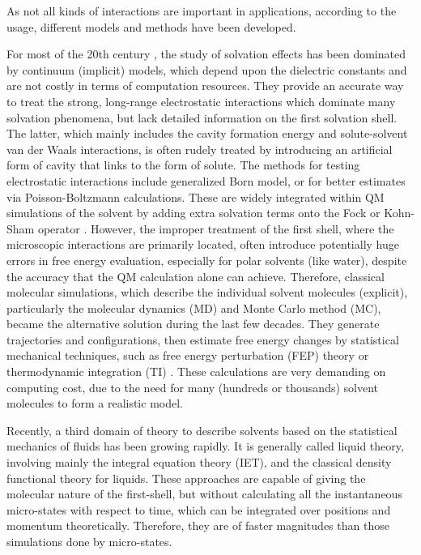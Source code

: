 As not all kinds of interactions are important in applications, according
to the usage, different models and methods have been developed.

For most of the 20th century \citep{Cramer_1999}, the study of
solvation effects has been dominated by continuum (implicit) models,
which depend upon the dielectric constants and are not costly
in terms of computation resources. They provide an accurate way to treat the
strong, long-range electrostatic interactions which dominate many
solvation phenomena, but lack detailed information on the first
solvation shell. The latter, which mainly includes the cavity formation
energy and solute-solvent van der Waals interactions, is often rudely
treated by introducing an artificial form of cavity that links to the
form of solute. The methods for testing electrostatic interactions include
generalized Born model, or for better estimates via Poisson-Boltzmann
calculations. These are widely integrated within \acs{QM} simulations
of the solvent by adding extra solvation terms onto the Fock or Kohn-Sham
operator \citep{Jensen,scrf,Tomasi_1994_implicit_model}. However,
the improper treatment of the first shell, where the microscopic interactions
are primarily located, often introduce potentially huge errors in free
energy evaluation, especially for polar solvents (like water), despite
the accuracy that the \acs{QM} calculation alone can achieve. Therefore,
classical molecular simulations, which describe the individual solvent
molecules (explicit), particularly the molecular dynamics (\acs{MD})
and Monte Carlo method (\acs{MC}), became the alternative solution
during the last few decades. They generate trajectories and configurations,
then estimate free energy changes by statistical mechanical techniques,
such as free energy perturbation (FEP) theory or thermodynamic integration
(TI) \citep{Jorgensen_1995_MC}. These calculations are very demanding
on computing cost, due to the need for many (hundreds or thousands) solvent molecules to form a realistic model.

Recently, a third domain of theory to describe solvents based on the
statistical mechanics of fluids has been growing rapidly. It is generally
called liquid theory, involving mainly the integral equation theory
(\acs{IET}), and the classical density functional theory for liquids.
These approaches are capable of giving the molecular nature of the first-shell,
but without calculating all the instantaneous micro-states with respect
to time, which can be integrated over positions and momentum theoretically.
Therefore, they are of faster magnitudes than those simulations done by
micro-states.

